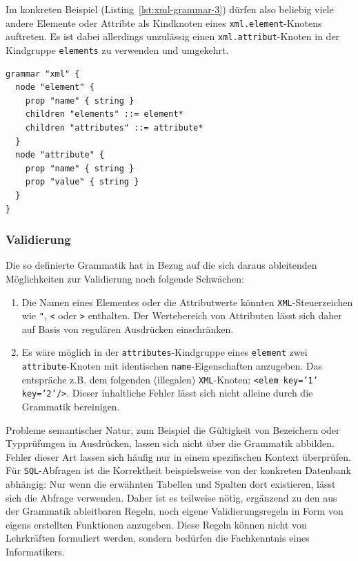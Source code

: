 \documentclass[paper=a4,fontsize=11pt,parskip=half]{scrartcl}
\begin{document}
Im konkreten Beispiel (Listing~\ref{lst:xml-grammar-3}) dürfen also beliebig viele andere Elemente oder Attribte als Kindknoten eines \texttt{xml.element}-Knotens auftreten. Es ist dabei allerdings unzulässig einen \texttt{xml.attribut}-Knoten in der Kindgruppe \texttt{elements} zu verwenden und umgekehrt.

\begin{lstlisting}[float=h, label={lst:xml-grammar-3},caption={\texttt{XML} Schritt 3 - Beziehungen zwischen Elementen und Attributen},captionpos=b,language={Grammar}]
grammar "xml" {
  node "element" {
    prop "name" { string }
    children "elements" ::= element*
    children "attributes" ::= attribute*
  }
  node "attribute" {
    prop "name" { string }
    prop "value" { string }
  }
}
\end{lstlisting}

\subsubsection{Validierung}

Die so definierte Grammatik hat in Bezug auf die sich daraus ableitenden Möglichkeiten zur Validierung noch folgende Schwächen:

\begin{enumerate}
\item Die Namen eines Elementes oder die Attributwerte könnten \texttt{XML}-Steuerzeichen wie \texttt{"}, \texttt{<} oder \texttt{>} enthalten. Der Wertebereich von Attributen lässt sich daher auf Basis von regulären Ausdrücken einschränken.
\item Es wäre möglich in der \texttt{attributes}-Kindgruppe eines \texttt{element} zwei \texttt{attribute}-Knoten mit identischen \texttt{name}-Eigenschaften anzugeben. Das entspräche z.B. dem folgenden (illegalen) \texttt{XML}-Knoten: \texttt{<elem key='1' key='2'/>}. Dieser inhaltliche Fehler lässt sich nicht alleine durch die Grammatik bereinigen.
\end{enumerate}

Probleme semantischer Natur, zum Beispiel die Gültigkeit von Bezeichern oder Typprüfungen in Ausdrücken, lassen sich nicht über die Grammatik abbilden. Fehler dieser Art lassen sich häufig nur in einem spezifischen Kontext überprüfen. Für \texttt{SQL}-Abfragen ist die Korrektheit beispielsweise von der konkreten Datenbank abhängig: Nur wenn die erwähnten Tabellen und Spalten dort existieren, lässt sich die Abfrage verwenden. Daher ist es teilweise nötig, ergänzend zu den aus der Grammatik ableitbaren Regeln, noch eigene Validierungsregeln in Form von eigens erstellten Funktionen anzugeben. Diese Regeln können nicht von Lehrkräften formuliert werden, sondern bedürfen die Fachkenntnis eines Informatikers.
\end{document}
